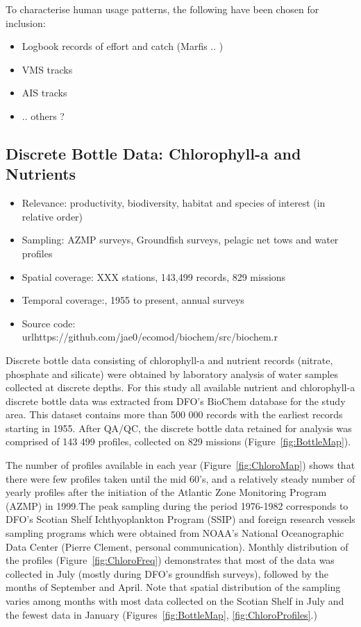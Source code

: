 \documentclass[letterpaper,portrait,11pt]{scrartcl}
\numberwithin{equation}{section}		%
\numberwithin{figure}{section}		%
\numberwithin{table}{section}				%
\begin{document}
To characterise human usage patterns, the following have been chosen for inclusion:

\begin{itemize}
	\item Logbook records of effort and catch (Marfis .. )
  \item VMS tracks
  \item AIS tracks
  \item ..  others ?
\end{itemize}

\subsection{Discrete Bottle Data: Chlorophyll-a and Nutrients}

\begin{itemize}
  \item Relevance:  productivity, biodiversity, habitat and species of interest (in relative order)
  \item Sampling:  AZMP surveys, Groundfish surveys, pelagic net tows and water profiles
  \item Spatial coverage: XXX stations, 143,499 records, 829 missions
  \item Temporal coverage:,  1955 to present, annual surveys
  \item Source code: \\url{https://github.com/jae0/ecomod/biochem/src/biochem.r}
\end{itemize}

Discrete bottle data consisting of chlorophyll-a and nutrient records (nitrate, phosphate and silicate) were obtained by laboratory analysis of water samples collected at discrete depths. For this study all available nutrient and chlorophyll-a discrete bottle data was extracted from DFO's BioChem database for the study area. This dataset contains more than 500 000 records with the earliest records starting in 1955. After QA/QC, the discrete bottle data retained for analysis was comprised of 143 499 profiles, collected on 829 missions (Figure~\ref{fig:BottleMap}).



The number of profiles available in each year (Figure~\ref{fig:ChloroMap}) shows that there were few profiles taken until the mid 60's, and a relatively steady number of yearly profiles after the initiation of the Atlantic Zone Monitoring Program (AZMP) in 1999.The peak sampling during the period 1976-1982 corresponds to DFO's Scotian Shelf Ichthyoplankton Program (SSIP) and foreign research vessels sampling programs which were obtained from NOAA's National Oceanographic Data Center (Pierre Clement, personal communication).  Monthly distribution of the profiles (Figure~\ref{fig:ChloroFreq})  demonstrates that most of the data was collected in July (mostly during DFO's groundfish surveys), followed by the months of September and April. Note that spatial distribution of the sampling varies among months with most data collected on the Scotian Shelf in July and the fewest data in January (Figures~\ref{fig:BottleMap}, \ref{fig:ChloroProfiles}.)
\end{document}
